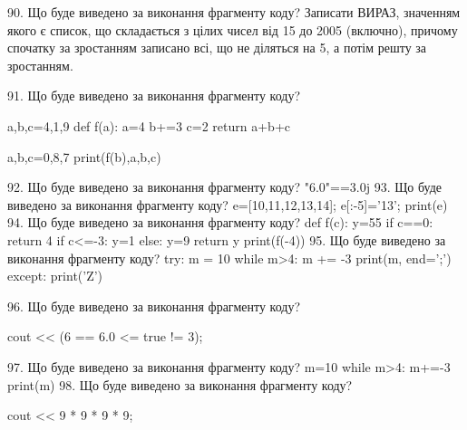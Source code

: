 \documentclass[11pt]{article}
\begin{document}
90. Що буде виведено за виконання фрагменту коду?
Записати ВИРАЗ, значенням якого є список, що складається з цілих чисел від 15 до 2005 (включно), причому спочатку за зростанням записано всі, що не діляться на 5, а потім решту за зростанням.

91. Що буде виведено за виконання фрагменту коду?

a,b,c=4,1,9
def f(a):
    a=4
    b+=3
    c=2
    return a+b+c

a,b,c=0,8,7
print(f(b),a,b,c)

92. Що буде виведено за виконання фрагменту коду?
"6.0"==3.0j
93. Що буде виведено за виконання фрагменту коду?
e=[10,11,12,13,14]; e[:-5]='13'; print(e)
94. Що буде виведено за виконання фрагменту коду?
def f(c):
      y=55
      if c==0: return 4
      if c<=-3: y=1
      else: y=9
      return y
   print(f(-4))
95. Що буде виведено за виконання фрагменту коду?
try:
    m = 10
    while m>4:
        m += -3
    print(m, end=';')
except:
    print('Z')

96. Що буде виведено за виконання фрагменту коду?

cout << (6 == 6.0 <= true != 3);

97. Що буде виведено за виконання фрагменту коду?
m=10
   while m>4: m+=-3
   print(m)
98. Що буде виведено за виконання фрагменту коду?

cout << 9 * 9 * 9 * 9;
\end{document}
